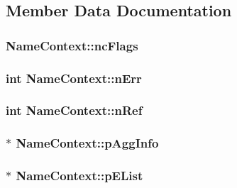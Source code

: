 \subsection{Member Data Documentation}
\hypertarget{struct_name_context_a3dcc2e5442b6a74440a15226139b78d2}{
\subsubsection[{nc\-Flags}]{ Name\-Context\-::nc\-Flags}}\label{struct_name_context_a3dcc2e5442b6a74440a15226139b78d2}
\hypertarget{struct_name_context_aba0b89b42e945c4c96d57a8fe011329c}{
\subsubsection[{n\-Err}]{\setlength{\rightskip}{0pt plus 5cm}int Name\-Context\-::n\-Err}}\label{struct_name_context_aba0b89b42e945c4c96d57a8fe011329c}
\hypertarget{struct_name_context_ad68616ce2a58fa1b135e0dcf953bdc97}{
\subsubsection[{n\-Ref}]{\setlength{\rightskip}{0pt plus 5cm}int Name\-Context\-::n\-Ref}}\label{struct_name_context_ad68616ce2a58fa1b135e0dcf953bdc97}
\hypertarget{struct_name_context_aeb3ff72c03dd770d421cadc2195a5644}{
\subsubsection[{p\-Agg\-Info}]{$\ast$ Name\-Context\-::p\-Agg\-Info}}\label{struct_name_context_aeb3ff72c03dd770d421cadc2195a5644}
\hypertarget{struct_name_context_a8c752d7fb9b28179156c569cc57ba6f2}{
\subsubsection[{p\-E\-List}]{$\ast$ Name\-Context\-::p\-E\-List}}\label{struct_name_context_a8c752d7fb9b28179156c569cc57ba6f2}
